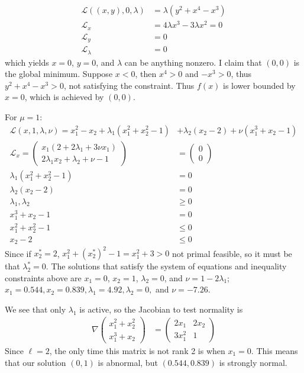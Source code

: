 \documentclass[12pt]{article}
\begin{document}
\begin{problem}[1]
\begin{align*}
	\mathscr{L}((x,y),0,\lambda) &= \lambda(y^2+x^{4}-x^3) \\
	\mathscr{L}_x &= 4 \lambda x^3-3 \lambda x^2 =0 \\
	\mathscr{L}_y &= 0 \\
	\mathscr{L}_\lambda &= 0 
\end{align*}
which yields $ x=0$,  $ y=0$, and  $ \lambda$ can be anything nonzero. I claim that $ (0,0)$ is the global minimum. Suppose $ x<0$, then $ x^{4} >0$ and $ -x^3 >0$, thus $ y^2 + x^{4} - x^3 >0$, not satisfying the constraint. Thus $ f(x)$ is lower bounded by  $ x=0$, which is achieved by  $ (0,0)$.
\end{problem}

\begin{problem}[2]
For $ \mu=1$:
\begin{align*}
	\mathscr{L}(x,1,\lambda,\nu) = x_1^2 - x_2 + \lambda_1(x_1^2+x_2^2-1) &+ \lambda_2(x_2-2)+ \nu(x_1^3+x_2-1) \\
	\mathscr{L}_x= \begin{pmatrix} x_1(2+2 \lambda_1 + 3 \nu x_1)\\ 2\lambda_1 x_2+ \lambda_2 + \nu-1 \end{pmatrix} &= \begin{pmatrix} 0\\0 \end{pmatrix}  \\
	\lambda_1 (x_1^2+x_2^2 -1 ) &= 0 \\
	\lambda_2 (x_2 -2) &= 0 \\
	\lambda_1 , \lambda_2  &\geq 0\\
	x_1^3+x_2-1 &= 0 \\
	x_1^2+x_2^2 -1 &\leq 0\\
	x_2 -2	& \leq 0
\end{align*}
Since if $ x_2^*=2$, $ x_1^2+(x_2^*)^2-1 = x_1^2 + 3 >0$ not primal feasible, so it must be that $ \lambda_2^* = 0$. The solutions that satisfy the system of equations and inequality constraints above are $ x_1=0$, $ x_2 =1$, $\lambda_2=0$, and $ \nu=1-2 \lambda_1$; $ x_1= 0.544, x_2= 0.839, \lambda_1 = 4.92, \lambda_2 = 0,$ and $ \nu= -7.26$.

We see that only $ \lambda_1$ is active, so the Jacobian to test normality is
\begin{align*}
	\nabla \begin{pmatrix} x_1^2+x_2^2\\x_1^3+x_2 \end{pmatrix}  &= \begin{pmatrix} 2x_1&2x_2\\3x_1^2&1 \end{pmatrix}
\end{align*}
Since $ \ell=2$, the only time this matrix is not rank 2 is when $ x_1 =0$. This means that our solution $ (0,1)$ is abnormal, but $ (0.544,0.839)$ is strongly normal.


\end{problem}
\end{document}
